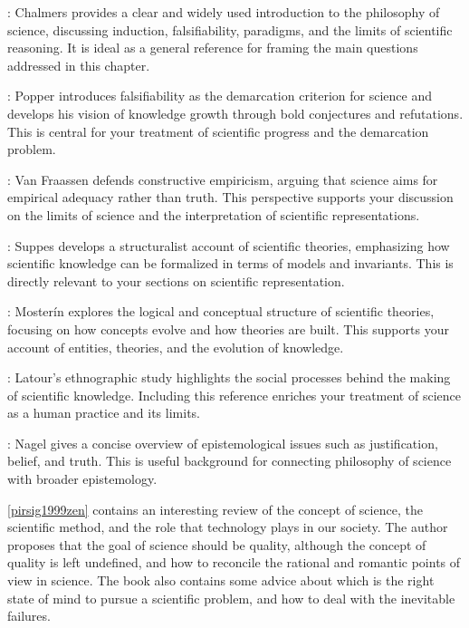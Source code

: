 \cite{chalmers2013thing}: Chalmers provides a clear and widely used introduction to the philosophy of science, discussing induction, falsifiability, paradigms, and the limits of scientific reasoning. It is ideal as a general reference for framing the main questions addressed in this chapter.

\cite{popper2014conjectures}: Popper introduces falsifiability as the demarcation criterion for science and develops his vision of knowledge growth through bold conjectures and refutations. This is central for your treatment of scientific progress and the demarcation problem.

\cite{van1980scientific}: Van Fraassen defends constructive empiricism, arguing that science aims for empirical adequacy rather than truth. This perspective supports your discussion on the limits of science and the interpretation of scientific representations.

\cite{suppes2002representation}: Suppes develops a structuralist account of scientific theories, emphasizing how scientific knowledge can be formalized in terms of models and invariants. This is directly relevant to your sections on scientific representation.

\cite{mosterin2016conceptos}: Mosterín explores the logical and conceptual structure of scientific theories, focusing on how concepts evolve and how theories are built. This supports your account of entities, theories, and the evolution of knowledge.

\cite{latour2013laboratory}: Latour's ethnographic study highlights the social processes behind the making of scientific knowledge. Including this reference enriches your treatment of science as a human practice and its limits.

\cite{nagel2014knowledge}: Nagel gives a concise overview of epistemological issues such as justification, belief, and truth. This is useful background for connecting philosophy of science with broader epistemology.

\ref{pirsig1999zen} contains an interesting review of the concept of science, the scientific method, and the role that technology plays in our society. The author proposes that the goal of science should be quality, although the concept of quality is left undefined, and how to reconcile the rational and romantic points of view in science. The book also contains some advice about which is the right state of mind to pursue a scientific problem, and how to deal with the inevitable failures.


